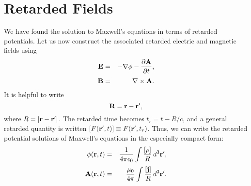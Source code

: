 \section{Retarded Fields}\label{sret}
We have found the solution to Maxwell's equations in terms of retarded potentials. Let us now
construct the associated retarded  electric and magnetic fields using
\begin{eqnarray}\label{e4.164a}
{\bf E} &= &- \nabla\phi - \frac{\partial {\bf A}}{\partial t},\\[0.5ex]
{\bf B} &=& \nabla\times{\bf A}.\label{e4.164b}
\end{eqnarray}
It is helpful to write
\begin{equation}
{\bf R} = {\bf r} - {\bf r}',
\end{equation}
where  $R = |{\bf r} - {\bf r}'|$. The retarded time becomes $t_r = t- R/c$, and a general retarded
quantity is written $[F({\bf r}', t)]\equiv F({\bf r}', t_r)$. Thus, we can write the retarded
potential solutions of Maxwell's equations in the especially compact form:
\begin{eqnarray}
\phi({\bf r},t)& = &\frac{1}{4\pi \epsilon_0} \int \frac{[\rho]}{R} \,d^3{\bf r}',\\[0.5ex]
{\bf A} ({\bf r},t)&=& \frac{\mu_0}{4\pi} \int \frac{[{\bf j}]}{R} \,d^3{\bf r}'.
\end{eqnarray}

